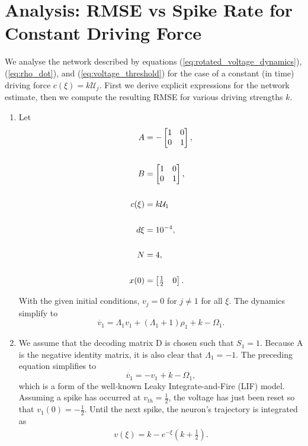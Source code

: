 \section{Analysis: RMSE vs Spike Rate for Constant Driving Force}




We analyse the network described by equations (\ref{eq:rotated_voltage_dynamics}), (\ref{eq:rho_dot}), and (\ref{eq:voltage_threshold}) for the case of a constant (in time) driving force $c(\xi) = k \mathcal{U}_j$. First we derive explicit expressions for the network estimate, then we compute the resulting RMSE for various driving strengths $k$.\\
\begin{enumerate}
\item Let 
\begin{align*}
A &= -\begin{bmatrix}  
1 & 0 \\
0 & 1
\end{bmatrix},\notag \\
\notag \\
B &= \begin{bmatrix}  
1 & 0 \\
0 & 1
\end{bmatrix}, \notag \\
\notag \\
c(\xi) &= k \mathcal{U}_1 \\
\notag \\
d\xi &= 10^{-4},\notag \\
\notag \\
N &= 4,\notag \\
\notag \\
x(0) &= \begin{bmatrix} \frac{1}{2} & 0 \end{bmatrix}.\notag 
\end{align*}

With the given initial conditions, $v_j = 0$ for $j \neq 1$ for all $\xi$. The dynamics simplify to 
\begin{equation*}
\label{eq:simple_voltage_dynamics_constant_driving}
\dot{v_1} = \Lambda_1 v_1 + (\Lambda_1 + 1)\rho_1 + k - \Omega_1.
\end{equation*}

\item We assume that the decoding matrix D is chosen such that $S_1 = 1$. Because A is the negative identity matrix, it is also clear that $\Lambda_1 = -1$. The preceding equation simplifies to  
\begin{equation}
\label{eq:simple_voltage_dynamics_constant_driving}
\dot{v_1} = -v_1 + k - \Omega_1,
\end{equation}
which is a form of the well-known Leaky Integrate-and-Fire (LIF) model. Assuming a spike has occurred at $v_{th} = \frac{1}{2}$, the voltage has just been reset so that $v_1(0) = -\frac{1}{2}$. Until the next spike, the neuron's trajectory is integrated as 
\begin{align*}
v(\xi) =  k - e^{-\xi} (k + \frac{1}{2}).
\end{align*}


\end{enumerate}
